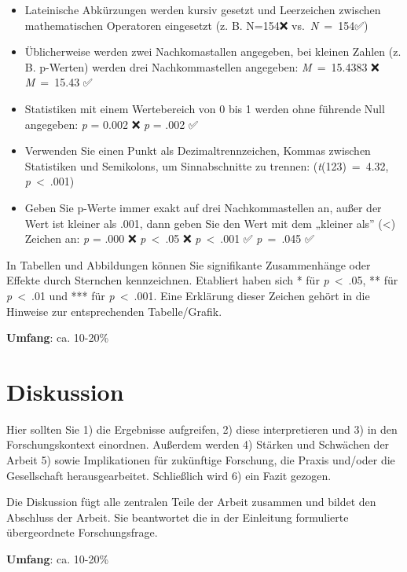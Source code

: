 \documentclass[
  letterpaper,
  DIV=11]{scrreprt}
\begin{document}
\begin{itemize}
\item
  Lateinische Abkürzungen werden kursiv gesetzt und Leerzeichen zwischen
  mathematischen Operatoren eingesetzt (z. B. N=154❌
  vs.~\emph{N}~=~154✅)
\item
  Üblicherweise werden zwei Nachkomastallen angegeben, bei kleinen
  Zahlen (z. B. p-Werten) werden drei Nachkommastellen angegeben:
  \emph{M}~=~15.4383 ❌ \emph{M}~=~15.43 ✅
\item
  Statistiken mit einem Wertebereich von 0 bis 1 werden ohne führende
  Null angegeben: \emph{p} = 0.002 ❌ \emph{p} = .002 ✅
\item
  Verwenden Sie einen Punkt als Dezimaltrennzeichen, Kommas zwischen
  Statistiken und Semikolons, um Sinnabschnitte zu trennen:
  (\emph{t}(123)~=~4.32, \emph{p}~\textless~.001)
\item
  Geben Sie p-Werte immer exakt auf drei Nachkommastellen an, außer der
  Wert ist kleiner als .001, dann geben Sie den Wert mit dem „kleiner
  als'' (\textless) Zeichen an: \emph{p} = .000 ❌
  \emph{p}~\textless~.05 ❌ \emph{p}~\textless~.001 ✅ \emph{p}~=~.045
  ✅
\end{itemize}

In Tabellen und Abbildungen können Sie signifikante Zusammenhänge oder
Effekte durch Sternchen kennzeichnen. Etabliert haben sich * für
\emph{p}~\textless~.05, ** für \emph{p}~\textless~.01 und *** für
\emph{p}~\textless~.001. Eine Erklärung dieser Zeichen gehört in die
Hinweise zur entsprechenden Tabelle/Grafik.

\textbf{Umfang}: ca. 10-20\%

\hypertarget{diskussion}{%
\section{Diskussion}\label{diskussion}}

Hier sollten Sie 1) die Ergebnisse aufgreifen, 2) diese interpretieren
und 3) in den Forschungskontext einordnen. Außerdem werden 4) Stärken
und Schwächen der Arbeit 5) sowie Implikationen für zukünftige
Forschung, die Praxis und/oder die Gesellschaft herausgearbeitet.
Schließlich wird 6) ein Fazit gezogen.

Die Diskussion fügt alle zentralen Teile der Arbeit zusammen und bildet
den Abschluss der Arbeit. Sie beantwortet die in der Einleitung
formulierte übergeordnete Forschungsfrage.

\textbf{Umfang}: ca. 10-20\%
\end{document}
